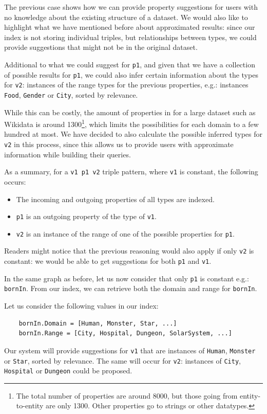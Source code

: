 The previous case shows how we can provide property suggestions for users with no knowledge about the existing structure of a dataset. We would also like to highlight what we have mentioned before about approximated results: since our index is not storing individual triples, but relationships between types, we could provide suggestions that might not be in the original dataset.

Additional to what we could suggest for \texttt{p1}, and given that we have a collection of possible results for \texttt{p1}, we could also infer certain information about the types for \texttt{v2}: instances of the range types for the previous properties, e.g.: instances \texttt{Food}, \texttt{Gender} or \texttt{City}, sorted by relevance.

While this can be costly, the amount of properties in for a large dataset such as Wikidata is around 1300\footnote{The total number of properties are around 8000, but those going from entity-to-entity are only 1300. Other properties go to strings or other datatypes.}, which limits the possibilities for each domain to a few hundred at most. We have decided to also calculate the possible inferred types for \texttt{v2} in this process, since this allows us to provide users with approximate information while building their queries. 

As a summary, for a \texttt{v1 p1 v2} triple pattern, where \texttt{v1} is constant, the following occurs:
\begin{itemize}
    \item The incoming and outgoing properties of all types are indexed.
    \item \texttt{p1} is an outgoing property of the type of \texttt{v1}.
    \item \texttt{v2} is an instance of the range of one of the possible properties for \texttt{p1}.
\end{itemize}

Readers might notice that the previous reasoning would also apply if only \texttt{v2} is constant: we would be able to get suggestions for both \texttt{p1} and \texttt{v1}.

\begin{example}
In the same graph as before, let us now consider that only \texttt{p1} is constant e.g.: \texttt{bornIn}. From our index, we can retrieve both the domain and range for \texttt{bornIn}. 

Let us consider the following values in our index:
\begin{verbatim}
    bornIn.Domain = [Human, Monster, Star, ...]
    bornIn.Range = [City, Hospital, Dungeon, SolarSystem, ...]
\end{verbatim}

Our system will provide suggestions for \texttt{v1} that are instances of \texttt{Human}, \texttt{Monster} or \texttt{Star}, sorted by relevance. The same will occur for \texttt{v2}: instances of \texttt{City}, \texttt{Hospital} or \texttt{Dungeon} could be proposed.

\end{example}


